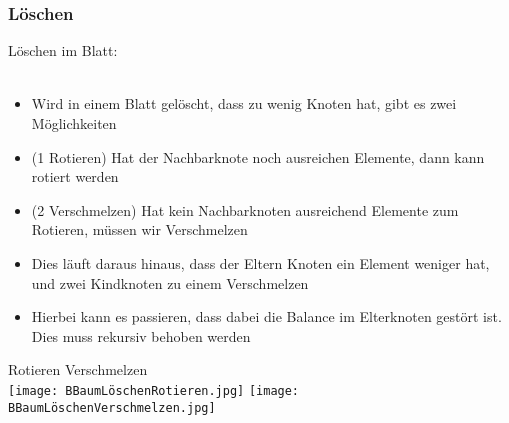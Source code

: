		\subsubsection{Löschen}
			Löschen im Blatt: \\ \\
			\begin{minipage}{0.6\textwidth}
				\begin{itemize}
					\item Wird in einem Blatt gelöscht, dass zu wenig Knoten hat, 
						gibt es zwei Möglichkeiten
					\item (1 Rotieren) Hat der Nachbarknote noch ausreichen Elemente,
						dann kann rotiert werden
					\item (2 Verschmelzen) Hat kein Nachbarknoten ausreichend Elemente zum Rotieren,
						müssen wir Verschmelzen
					\item Dies läuft daraus hinaus, dass der Eltern Knoten ein Element weniger hat, 
						und zwei Kindknoten zu einem Verschmelzen
					\item Hierbei kann es passieren, dass dabei die Balance im Elterknoten gestört
						ist. Dies muss rekursiv behoben werden
				\end{itemize}
			\end{minipage}
			\hspace{0.5cm}
			\begin{minipage}{0.35\textwidth}
				\begin{center}
					\hspace{0.3cm} Rotieren \hspace{1.1cm} Verschmelzen \\
					\texttt{[image: BBaumLöschenRotieren.jpg]}
					\texttt{[image: BBaumLöschenVerschmelzen.jpg]}
				\end{center}
			\end{minipage}
			\mbox{} \\ \\ \\

